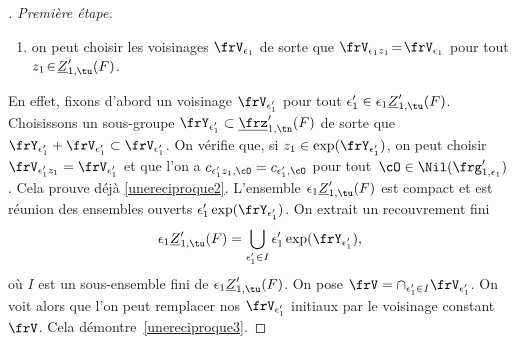 \begin{proof}[\proofname. Première étape]
\begin{enumerate}
\item\label{unereciproque3}
on peut choisir les voisinages $\frV_{\epsilon_{1}}$ de sorte que $\frV_{\epsilon_{1}z_{1}}\!=\!\frV_{\epsilon_{1}}$ pour tout $z_{1}\!\in\!\underline{Z}'_{1,\tu}(F)$.
\end{enumerate}

En effet, fixons d'abord un voisinage $\frV_{\epsilon'_{1}}$ pour tout $\epsilon'_{1}\in \epsilon_{1}\underline{Z}'_{1,\tu}(F)$.
Choisissons un sous-groupe $\frY_{\epsilon'_{1}}\subset \underline{\frz}'_{1,\tn}(F)$ de sorte que $\frY_{\epsilon'_{1}}+\frV_{\epsilon'_{1}}\subset \frV_{\epsilon'_{1}}$. On vérifie que, si $z_{1}\in \exp(\frY_{\epsilon'_{1}}) $, on peut choisir $\frV_{\epsilon'_{1}z_{1}}=\frV_{\epsilon'_{1}}$ et que l'on a
$c_{\epsilon'_{1}z_{1},\cO}=c_{\epsilon'_{1},\cO}$ pour tout~$\cO\in \Nil(\frg'_{1,\epsilon_{1}})$. Cela prouve déjà \eqref{unereciproque2}. L'ensemble $\epsilon_{1}\underline{Z}'_{1,\tu}(F)$ est compact et est réunion des ensembles ouverts $\epsilon'_{1}\exp(\frY_{\epsilon'_{1}})$. On extrait un recouvrement fini
\[
\epsilon_{1}\underline{Z}'_{1,\tu}(F)=\bigcup_{\epsilon'_{1}\in I}\epsilon'_{1}\exp(\frY_{\epsilon'_{1}}),
\]
où $I$ est un sous-ensemble fini de $\epsilon_{1}\underline{Z}'_{1,\tu}(F)$. On pose $\frV=\cap_{\epsilon'_{1}\in I}\frV_{\epsilon'_{1}}$. On voit alors que l'on peut remplacer nos $\frV_{\epsilon'_{1}}$ initiaux par le voisinage constant $\frV$. Cela démontre~\eqref{unereciproque3}.


\end{proof}
